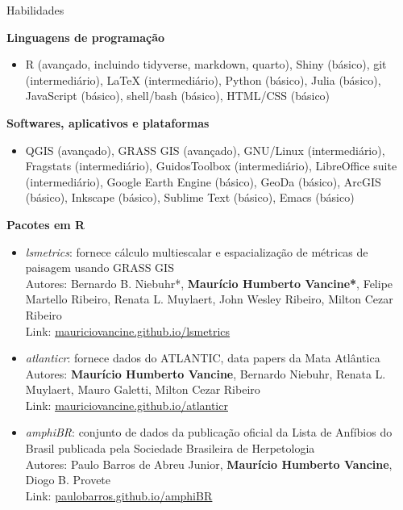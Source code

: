 \documentclass{resume}
\begin{document}
\begin{rSection}{Habilidades}

{\bf Linguagens de programação}
\begin{itemize}
\item R (avançado, incluindo tidyverse, markdown, quarto), Shiny (básico), git (intermediário), LaTeX (intermediário), Python (básico), Julia (básico), JavaScript (básico), shell/bash (básico), HTML/CSS (básico)
\end{itemize}

{\bf Softwares, aplicativos e plataformas}
\begin{itemize}
\item QGIS (avançado), GRASS GIS (avançado), GNU/Linux (intermediário), Fragstats (intermediário), GuidosToolbox (intermediário), LibreOffice suite (intermediário), Google Earth Engine (básico), GeoDa (básico), ArcGIS (básico), Inkscape (básico), Sublime Text (básico), Emacs (básico)
\end{itemize}

{\bf Pacotes em R}
\begin{itemize} 
\item {\it lsmetrics}: fornece cálculo multiescalar e espacialização de métricas de paisagem usando GRASS GIS\\
Autores: Bernardo B. Niebuhr*, {\bf Maurício Humberto Vancine*}, Felipe Martello Ribeiro, Renata L. Muylaert, John Wesley Ribeiro, Milton Cezar Ribeiro\\
Link: \href{https://mauriciovancine.github.io/lsmetrics}{\underline{mauriciovancine.github.io/lsmetrics}}

\item {\it atlanticr}: fornece dados do ATLANTIC, data papers da Mata Atlântica\\
Autores: {\bf Maurício Humberto Vancine}, Bernardo Niebuhr, Renata L. Muylaert, Mauro Galetti, Milton Cezar Ribeiro\\
Link: \href{https://mauriciovancine.github.io/atlanticr}{\underline{mauriciovancine.github.io/atlanticr}}

\item {\it amphiBR}: conjunto de dados da publicação oficial da Lista de Anfíbios do Brasil publicada pela Sociedade Brasileira de Herpetologia\\
Autores: Paulo Barros de Abreu Junior, {\bf Maurício Humberto Vancine}, Diogo B. Provete\\
Link: \href{https://paulobarros.github.io/amphiBR}{\underline{paulobarros.github.io/amphiBR}}


\end{itemize}
\end{rSection}
\end{document}
